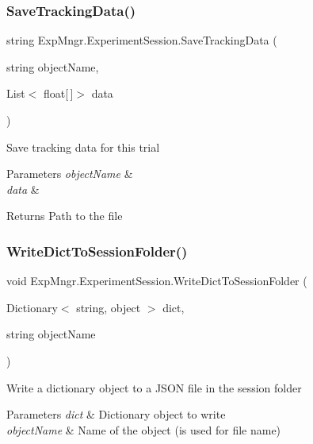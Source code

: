 \subsubsection{\texorpdfstring{Save\+Tracking\+Data()}{SaveTrackingData()}}
{\footnotesize\ttfamily string Exp\+Mngr.\+Experiment\+Session.\+Save\+Tracking\+Data (\begin{DoxyParamCaption}\item[{string}]{object\+Name,  }\item[{List$<$ float\mbox{[}$\,$\mbox{]}$>$}]{data }\end{DoxyParamCaption})}



Save tracking data for this trial 


\begin{DoxyParams}{Parameters}
{\em object\+Name} & \\
\hline
{\em data} & \\
\hline
\end{DoxyParams}
\begin{DoxyReturn}{Returns}
Path to the file
\end{DoxyReturn}
\mbox{\label{class_exp_mngr_1_1_experiment_session_a2c8bfa562d1cf0e5ba511088bf9355c7}} 
\subsubsection{\texorpdfstring{Write\+Dict\+To\+Session\+Folder()}{WriteDictToSessionFolder()}}
{\footnotesize\ttfamily void Exp\+Mngr.\+Experiment\+Session.\+Write\+Dict\+To\+Session\+Folder (\begin{DoxyParamCaption}\item[{Dictionary$<$ string, object $>$}]{dict,  }\item[{string}]{object\+Name }\end{DoxyParamCaption})}



Write a dictionary object to a J\+S\+ON file in the session folder 


\begin{DoxyParams}{Parameters}
{\em dict} & Dictionary object to write\\
\hline
{\em object\+Name} & Name of the object (is used for file name)\\
\hline
\end{DoxyParams}


